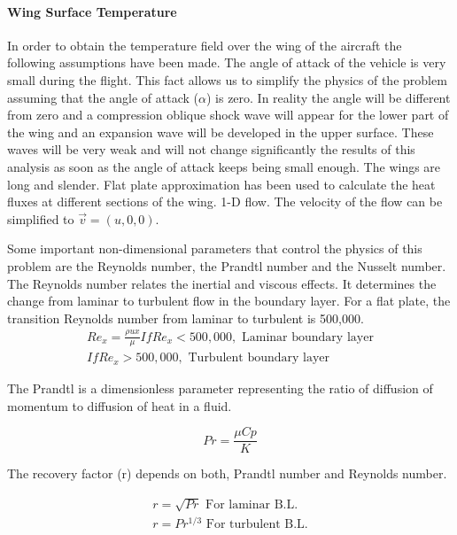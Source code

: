 \paragraph{Wing Surface Temperature}
In order to obtain the temperature field over the wing of the aircraft the following assumptions have been made.
	The angle of attack of the vehicle is very small during the flight. This fact allows us to simplify the physics of the problem assuming that the angle of attack ($\alpha$) is zero. In reality the angle will be different from zero and a compression oblique shock wave will appear for the lower part of the wing and an expansion wave will be developed in the upper surface. These waves will be very weak and will not change significantly the results of this analysis as soon as the angle of attack keeps being small enough.
	The wings are long and slender. Flat plate approximation has been used to calculate the heat fluxes at different sections of the wing.
	1-D flow. The velocity of the flow can be simplified to $\overrightarrow{v}=(u,0,0)$.
	
Some important non-dimensional parameters that control the physics of this problem are the Reynolds number, the Prandtl number and the Nusselt number.
The Reynolds number relates the inertial and viscous effects. It determines the change from laminar to turbulent flow in the boundary layer. For a flat plate, the transition Reynolds number from laminar to turbulent is 500,000.
\begin{equation}
\begin{split}
Re_x=\frac{\rho u x}{\mu}	
If   Re_x<500,000, \text{  Laminar boundary layer} \\
	If   Re_x>500,000, \text{  Turbulent boundary layer}
\end{split}
\end{equation}

The Prandtl is a dimensionless parameter representing the ratio of diffusion of momentum to diffusion of heat in a fluid.

\begin{equation}
Pr=\frac{\mu Cp}{K}
\end{equation}

The recovery factor (r) depends on both, Prandtl number and Reynolds number.

\begin{equation}
\begin{split}
r=\sqrt{Pr} \text{  For laminar B.L.}	\\
r=Pr^{1/3} \text{  For turbulent B.L.}
\end{split}
\end{equation}

